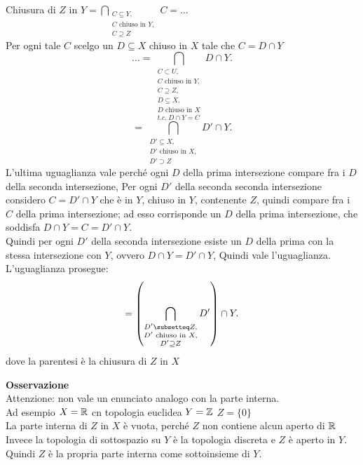 \documentclass[12px]{article}
\begin{document}
	 \begin{dimo}
		 Chiusura di $Z $ in $Y = \displaystyle \bigcap_{\substack{C\subseteq Y,\\ C\text{ chiuso in } Y,\\ C\supseteq Z}}C = \ldots $ \\
		 Per ogni tale $C$ scelgo un $D\subseteq X$ chiuso in $X$ tale che $C = D\cap Y$\\
		  \[
			  \ldots = \bigcap_{\substack{C\subset U,\\ C\text{ chiuso in } Y,\\ C\supseteq Z,\\ D\subseteq X,\\ D \text{ chiuso in } X \\ t.c. \ D\cap Y = C}}D\cap Y 
		 .\] 
		 \[
			 = \bigcap_{\substack{D'\subseteq X,\\ D'\text{ chiuso in } X,\\ D'\supset Z}}D'\cap Y
		 .\] 
		 L'ultima uguaglianza vale perché ogni $D$ della prima intersezione compare fra i $D$ della seconda intersezione, Per ogni $D'$ della seconda seconda intersezione considero $C = D'\cap Y$ che è in  $Y$, chiuso in $Y$, contenente $Z$, quindi compare fra i  $C$ della prima intersezione; ad esso corrisponde un $D$ della prima intersezione, che soddisfa $D\cap Y = C =D'\cap Y.$\\
		 Quindi per ogni  $D'$ della seconda intersezione esiste un $D$ della prima con la stessa intersezione con $Y$, ovvero  $D\cap Y = D'\cap Y$, Quindi vale l'uguaglianza.\\
		 L'uguaglianza prosegue:\\
		  \[
			  = \left( \bigcap_{\substack{D'\subsetteq Z,\\ D'\text{ chiuso in } X,\\ D'\supseteq Z}} D' \right)\cap Y
		 .\] 
		 dove la parentesi è la chiusura di $Z$ in $X$
	 \end{dimo}
	 \textbf{Osservazione}\\
	 Attenzione: non vale un enunciato analogo con la parte interna.\\
	 Ad esempio $X = \mathbb{R}$ cn topologia euclidea $Y = \mathbb{Z}$  $Z= \{0\}$\\
	 La parte interna di  $Z$ in $X$ è vuota, perché $Z$ non contiene alcun aperto di $\mathbb{R}$\\
	 Invece la topologia di sottospazio su  $Y$ è la topologia discreta e $Z$ è aperto in $Y$.\\
	 Quindi  $Z$ è la propria parte interna come sottoinsieme di $Y$.
\end{document}
